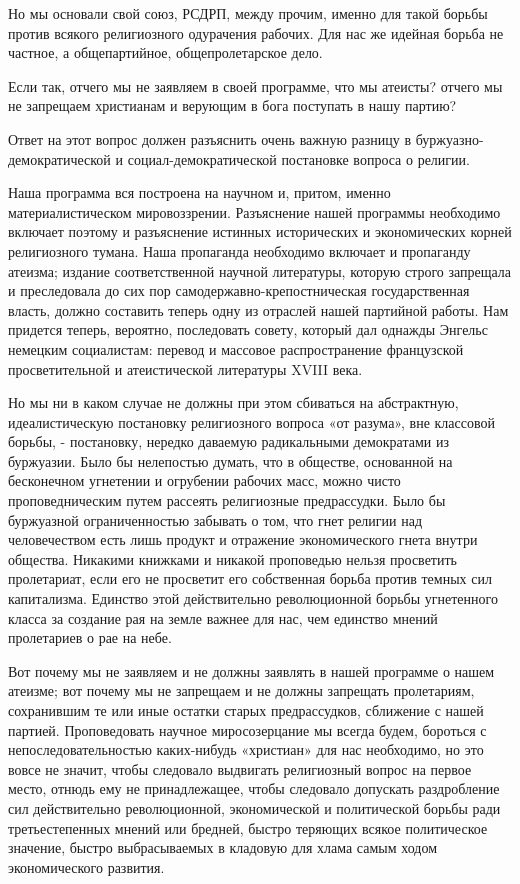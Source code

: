 \documentclass[12pt]{article}
\newcommand{\parnum}{(\arabic{parcount})}
\newcounter{parcount}
\newenvironment{parnumbers}{%
  \par%
  \everypar{\noindent \stepcounter{parcount}\marginpar[]{\parnum}}%
}{}
\begin{document}
\begin{parnumbers}
Но мы основали свой союз, РСДРП, между прочим, именно для такой борьбы против всякого религиозного одурачения рабочих. Для нас же идейная борьба не частное, а общепартийное, общепролетарское дело.

Если так, отчего мы не заявляем в своей программе, что мы атеисты? отчего мы не запрещаем христианам и верующим в бога поступать в нашу партию?

Ответ на этот вопрос должен разъяснить очень важную разницу в буржуазно-демократической и социал-демократической постановке вопроса о религии.

Наша программа вся построена на научном и, притом, именно материалистическом мировоззрении. Разъяснение нашей программы необходимо включает поэтому и разъяснение истинных исторических и экономических корней религиозного тумана. Наша пропаганда необходимо включает и пропаганду атеизма; издание соответственной научной литературы, которую строго запрещала и преследовала до сих пор самодержавно-крепостническая государственная власть, должно составить теперь одну из отраслей нашей партийной работы. Нам придется теперь, вероятно, последовать совету, который дал однажды Энгельс немецким социалистам: перевод и массовое распространение французской просветительной и атеистической литературы XVIII века.

Но мы ни в каком случае не должны при этом сбиваться на абстрактную, идеалистическую постановку религиозного вопроса «от разума», вне классовой борьбы, - постановку, нередко даваемую радикальными демократами из буржуазии. Было бы нелепостью думать, что в обществе, основанной на бесконечном угнетении и огрубении рабочих масс, можно чисто проповедническим путем рассеять религиозные предрассудки. Было бы буржуазной ограниченностью забывать о том, что гнет религии над человечеством есть лишь продукт и отражение экономического гнета внутри общества. Никакими книжками и никакой проповедью нельзя просветить пролетариат, если его не просветит его собственная борьба против темных сил капитализма. Единство этой действительно революционной борьбы угнетенного класса за создание рая на земле важнее для нас, чем единство мнений пролетариев о рае на небе.

Вот почему мы не заявляем и не должны заявлять в нашей программе о нашем атеизме; вот почему мы не запрещаем и не должны запрещать пролетариям, сохранившим те или иные остатки старых предрассудков, сближение с нашей партией. Проповедовать научное миросозерцание мы всегда будем, бороться с непоследовательностью каких-нибудь «христиан» для нас необходимо, но это вовсе не значит, чтобы следовало выдвигать религиозный вопрос на первое место, отнюдь ему не принадлежащее, чтобы следовало допускать раздробление сил действительно революционной, экономической и политической борьбы ради третьестепенных мнений или бредней, быстро теряющих всякое политическое значение, быстро выбрасываемых в кладовую для хлама самым ходом экономического развития.


\end{parnumbers}
\end{document}
